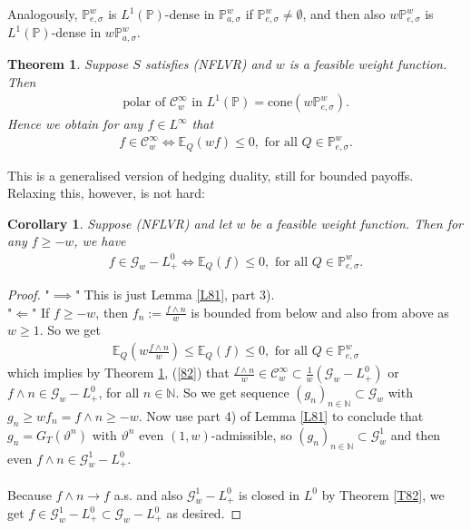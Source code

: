 \documentclass[12pt,a4paper, twoside]{article}
\newtheorem{thm}{Theorem}[section]
\newtheorem{cor}{Corollary}[section]
\theoremstyle{definition}
\newcommand{\EE}{\mathbb{E}} %
\newcommand{\PP}{\mathbb{P}} %
\begin{document}
\noindent Analogously, $\PP_{e, \sigma}^w$ is $L^1(\PP)$-dense in $\PP_{a, \sigma}^w$ if $\PP_{e,\sigma}^w \neq \emptyset$, and then also $w\PP_{e, \sigma}^w$ is $L^1(\PP)$-dense in $w\PP_{a, \sigma}^w$. 
\begin{thm} \label{T84} Suppose $S$ satisfies (NFLVR) and $w$ is a feasible weight function. Then 
\begin{align*} \label{81}
\text{polar of $\mathcal{C}_w^\infty$ in }L^1( \PP)=\text{cone}(w \PP_{e, \sigma}^w). \tag{9.1}
\end{align*}
Hence we obtain for any $f \in L^\infty$ that 
\begin{align*} \label{82}
f \in \mathcal{C}_w^\infty \iff \EE_Q(wf) \leq 0, \text{ for all } Q \in \PP_{e, \sigma}^w. \tag{9.2}
\end{align*}
\end{thm}
\newpage
This is a generalised version of hedging duality, still for bounded payoffs. Relaxing this, however, is not hard:
\begin{cor} \label{C85} Suppose (NFLVR) and let $w$ be a feasible weight function. Then for any $f \geq -w$, we have 
\begin{align*}
f \in \mathcal{G}_w-L_+^0 \iff \EE_Q(f) \leq 0, \text{ for all } Q \in \PP_{e, \sigma}^w.
\end{align*}
\end{cor}
\begin{proof}
"$\implies$" This is just Lemma \ref{L81}, part 3). \\
"$\Longleftarrow$" If $f \geq -w$, then $f_n := \frac{f \wedge n}{w}$ is bounded from below and also from above as $w \geq 1$. So we get 
\begin{align*}
\EE_Q\left( w \frac{f \wedge n}{w} \right) \leq \EE_Q(f) \leq 0, \text{ for all } Q \in \PP_{e, \sigma}^w
\end{align*}
which implies by Theorem \ref{T84}, (\ref{82}) that $\frac{f \wedge n}{w} \in \mathcal{C}_w^\infty \subset \frac{1}{w}( \mathcal{G}_w - L_+^0)$ or $f \wedge n \in \mathcal{G}_w - L_+^0$, for all $n \in \mathbb{N}$. So we get sequence $(g_n)_{n \in \mathbb{N}} \subset \mathcal{G}_w$ with $g_n \geq w f_n = f \wedge n \geq -w$. Now use part 4) of Lemma \ref{L81} to conclude that $g_n = G_T( \vartheta^n)$ with $\vartheta^n$ even $(1,w)$-admissible, so $(g_n)_{n \in \mathbb{N}} \subset \mathcal{G}_w^1$ and then even $f \wedge n \in \mathcal{G}_w^1 - L_+^0$. 
\\\\
Because $f \wedge n \to f$ a.s. and also $\mathcal{G}_w^1- L_+^0$ is closed in $L^0$ by Theorem \ref{T82}, we get $f \in \mathcal{G}_w^1-L_+^0 \subset \mathcal{G}_w- L_+^0$ as desired. 
\end{proof}
\end{document}
